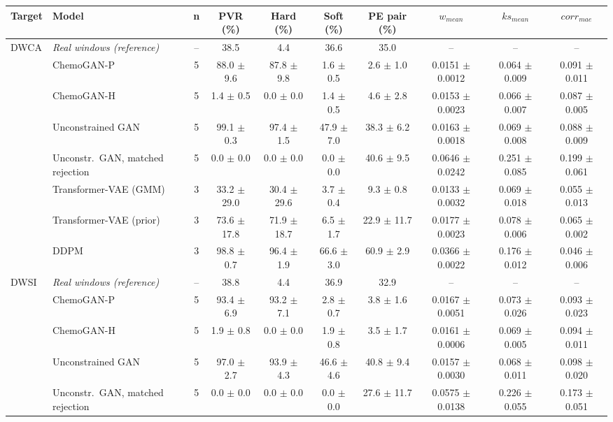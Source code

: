 \begin{tabular}{llcccccccc}
\hline
\textbf{Target} & \textbf{Model} & \textbf{n} & \textbf{PVR (\%)} & \textbf{Hard (\%)} & \textbf{Soft (\%)} & \textbf{PE pair (\%)} & \textbf{$w_{mean}$} & \textbf{$ks_{mean}$} & \textbf{$corr_{mae}$} \\ \hline
DWCA & \textit{Real windows (reference)} & -- & 38.5 & 4.4 & 36.6 & 35.0 & -- & -- & -- \\
 & ChemoGAN-P & 5 & 88.0 $\pm$ 9.6 & 87.8 $\pm$ 9.8 & 1.6 $\pm$ 0.5 & 2.6 $\pm$ 1.0 & 0.0151 $\pm$ 0.0012 & 0.064 $\pm$ 0.009 & 0.091 $\pm$ 0.011 \\
 & ChemoGAN-H & 5 & 1.4 $\pm$ 0.5 & 0.0 $\pm$ 0.0 & 1.4 $\pm$ 0.5 & 4.6 $\pm$ 2.8 & 0.0153 $\pm$ 0.0023 & 0.066 $\pm$ 0.007 & 0.087 $\pm$ 0.005 \\
 & Unconstrained GAN & 5 & 99.1 $\pm$ 0.3 & 97.4 $\pm$ 1.5 & 47.9 $\pm$ 7.0 & 38.3 $\pm$ 6.2 & 0.0163 $\pm$ 0.0018 & 0.069 $\pm$ 0.008 & 0.088 $\pm$ 0.009 \\
 & Unconstr.\ GAN, matched rejection & 5 & 0.0 $\pm$ 0.0 & 0.0 $\pm$ 0.0 & 0.0 $\pm$ 0.0 & 40.6 $\pm$ 9.5 & 0.0646 $\pm$ 0.0242 & 0.251 $\pm$ 0.085 & 0.199 $\pm$ 0.061 \\
 & Transformer-VAE (GMM) & 3 & 33.2 $\pm$ 29.0 & 30.4 $\pm$ 29.6 & 3.7 $\pm$ 0.4 & 9.3 $\pm$ 0.8 & 0.0133 $\pm$ 0.0032 & 0.069 $\pm$ 0.018 & 0.055 $\pm$ 0.013 \\
 & Transformer-VAE (prior) & 3 & 73.6 $\pm$ 17.8 & 71.9 $\pm$ 18.7 & 6.5 $\pm$ 1.7 & 22.9 $\pm$ 11.7 & 0.0177 $\pm$ 0.0023 & 0.078 $\pm$ 0.006 & 0.065 $\pm$ 0.002 \\
 & DDPM & 3 & 98.8 $\pm$ 0.7 & 96.4 $\pm$ 1.9 & 66.6 $\pm$ 3.0 & 60.9 $\pm$ 2.9 & 0.0366 $\pm$ 0.0022 & 0.176 $\pm$ 0.012 & 0.046 $\pm$ 0.006 \\
\hline
DWSI & \textit{Real windows (reference)} & -- & 38.8 & 4.4 & 36.9 & 32.9 & -- & -- & -- \\
 & ChemoGAN-P & 5 & 93.4 $\pm$ 6.9 & 93.2 $\pm$ 7.1 & 2.8 $\pm$ 0.7 & 3.8 $\pm$ 1.6 & 0.0167 $\pm$ 0.0051 & 0.073 $\pm$ 0.026 & 0.093 $\pm$ 0.023 \\
 & ChemoGAN-H & 5 & 1.9 $\pm$ 0.8 & 0.0 $\pm$ 0.0 & 1.9 $\pm$ 0.8 & 3.5 $\pm$ 1.7 & 0.0161 $\pm$ 0.0006 & 0.069 $\pm$ 0.005 & 0.094 $\pm$ 0.011 \\
 & Unconstrained GAN & 5 & 97.0 $\pm$ 2.7 & 93.9 $\pm$ 4.3 & 46.6 $\pm$ 4.6 & 40.8 $\pm$ 9.4 & 0.0157 $\pm$ 0.0030 & 0.068 $\pm$ 0.011 & 0.098 $\pm$ 0.020 \\
 & Unconstr.\ GAN, matched rejection & 5 & 0.0 $\pm$ 0.0 & 0.0 $\pm$ 0.0 & 0.0 $\pm$ 0.0 & 27.6 $\pm$ 11.7 & 0.0575 $\pm$ 0.0138 & 0.226 $\pm$ 0.055 & 0.173 $\pm$ 0.051 \\

\end{tabular}

